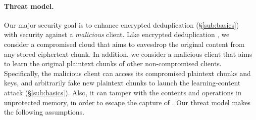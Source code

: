 



\paragraph{Threat model.} Our major security goal is to enhance encrypted deduplication (\S\ref{sub:basics}) with security against a {\em malicious} client. Like encrypted deduplication \cite{bellare13a}, we consider a compromised cloud that aims to eavesdrop the original content from any stored ciphertext chunk. In addition, we consider a malicious client that aims to learn the original plaintext chunks of other non-compromised clients. Specifically, the malicious client can access its compromised  plaintext chunks and keys, and arbitrarily fake new plaintext chunks to launch the learning-content attack (\S\ref{sub:basics}). Also, it can tamper with the  contents and operations in unprotected memory, in order to escape the capture of \sysnameF.
Our threat model makes the following assumptions.
